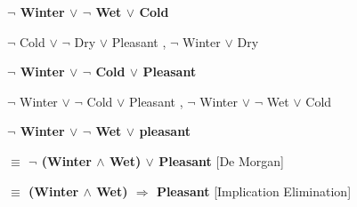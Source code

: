 \documentclass[10pt]{article}
\begin{document}
\begin{enumerate}
\begin{center}
  \textbf{$\neg$ Winter $\vee$ $\neg$ Wet $\vee$ Cold} \par
  $\neg$ Cold $\vee$ $\neg$ Dry $\vee$ Pleasant , $\neg$ Winter $\vee$ Dry \par
  \hrulefill
  
  \textbf{$\neg$ Winter $\vee$ $\neg$ Cold $\vee$ Pleasant} \par
  $\neg$ Winter $\vee$ $\neg$ Cold $\vee$ Pleasant , $\neg$ Winter $\vee$ $\neg$ Wet $\vee$ Cold \par
  \hrulefill
  
  \textbf{$\neg$ Winter $\vee$ $\neg$ Wet $\vee$ pleasant} \par
  \textbf{$\equiv$ $\neg$ (Winter $\wedge$ Wet) $\vee$ Pleasant} [De Morgan] \par
  \textbf{$\equiv$ (Winter $\wedge$ Wet) $\Rightarrow$ Pleasant} [Implication Elimination]
  \end{center}
\newpage


\end{enumerate}
\end{document}
